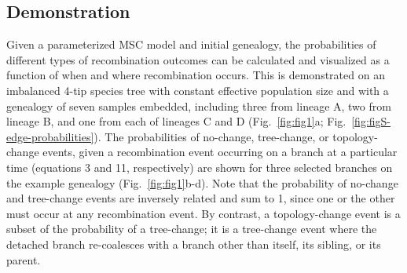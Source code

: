 \documentclass[11pt]{article}
\begin{document}
\subsection{Demonstration}
Given a parameterized MSC model and initial genealogy, the probabilities of 
different types of recombination outcomes can be calculated and visualized as 
a function of when and where recombination occurs. This is demonstrated on an 
imbalanced 4-tip species tree with constant effective population size 
and with a genealogy of seven samples embedded, 
including three from lineage A, two from lineage B, and one from each of lineages
C and D (Fig.~\ref{fig:fig1}a; Fig.~\ref{fig:figS-edge-probabilities}). 
The probabilities of no-change, tree-change, or topology-change events, 
given a recombination event occurring on a branch at a particular time 
(equations 3 and 11, respectively) are shown for three selected branches
on the example genealogy (Fig.~\ref{fig:fig1}b-d). 
Note that the probability of no-change and tree-change events 
are inversely related and sum to 1, since one or the other must occur at any 
recombination event. By contrast, a topology-change event is a subset of the 
probability of a tree-change; 
it is a tree-change event where the detached branch re-coalesces with 
a branch other than itself, its sibling, or its parent.

\end{document}
